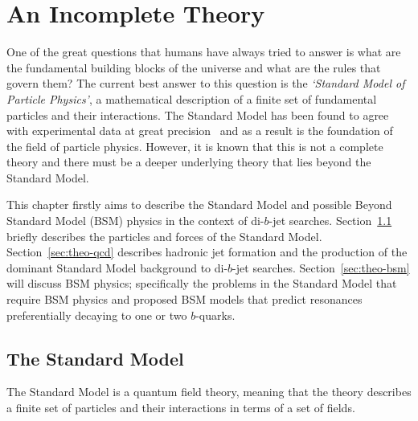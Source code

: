 \chapter{An Incomplete Theory}
\label{sec:theo}

One of the great questions that humans have always tried to answer is
what are the fundamental building blocks of the universe and what are the rules that govern them?
%
The current best answer to this question is the \textit{`Standard Model of Particle Physics'},
a mathematical description of a finite set of fundamental particles and their interactions.
The Standard Model has been found to agree with experimental data at great precision~\cite{theo-ewTests}
and as a result is the foundation of the field of particle physics.
However, it is known that this is not a complete theory and there must be
a deeper underlying theory that lies beyond the Standard Model.

This chapter firstly aims to describe the Standard Model and
possible Beyond Standard Model (BSM) physics in the context of di-$b$-jet searches.
Section~\ref{sec:theo-sm} briefly describes the particles and forces of the Standard Model.
Section~\ref{sec:theo-qcd} describes hadronic jet formation and the production of the dominant Standard Model background to di-$b$-jet searches.
Section~\ref{sec:theo-bsm} will discuss BSM physics;
specifically the problems in the Standard Model that require BSM physics
and proposed BSM models that predict resonances preferentially decaying to one or two $b$-quarks.

\section{The Standard Model}
\label{sec:theo-sm}

The Standard Model is a quantum field theory,
meaning that the theory describes a finite set of particles and their interactions in
terms of a set of fields.


